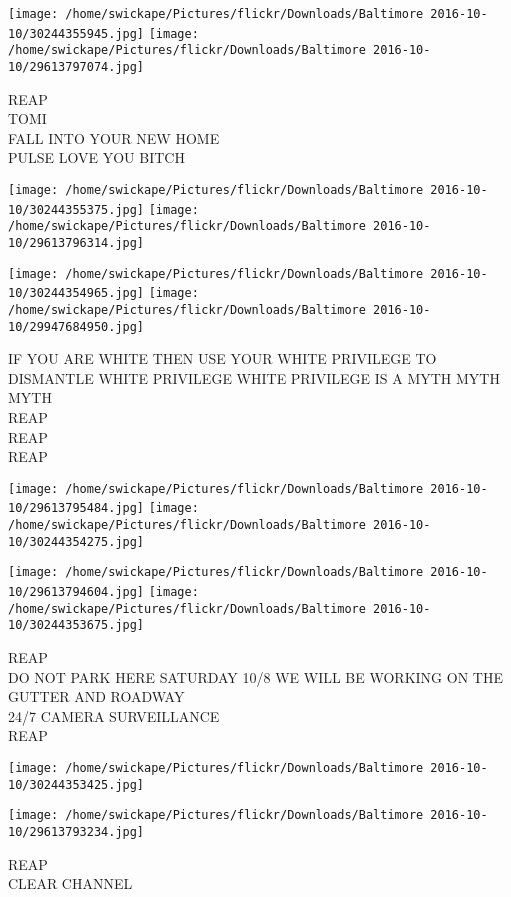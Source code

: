 \documentclass[10pt,letterpaper]{article}
\begin{document}
\texttt{[image: /home/swickape/Pictures/flickr/Downloads/Baltimore 2016-10-10/30244355945.jpg]}
\texttt{[image: /home/swickape/Pictures/flickr/Downloads/Baltimore 2016-10-10/29613797074.jpg]}

REAP\\
TOMI\\
FALL INTO YOUR NEW HOME\\
PULSE LOVE YOU BITCH
\pagebreak

\texttt{[image: /home/swickape/Pictures/flickr/Downloads/Baltimore 2016-10-10/30244355375.jpg]}
\texttt{[image: /home/swickape/Pictures/flickr/Downloads/Baltimore 2016-10-10/29613796314.jpg]}

\texttt{[image: /home/swickape/Pictures/flickr/Downloads/Baltimore 2016-10-10/30244354965.jpg]}
\texttt{[image: /home/swickape/Pictures/flickr/Downloads/Baltimore 2016-10-10/29947684950.jpg]}

IF YOU ARE WHITE THEN USE YOUR WHITE PRIVILEGE TO DISMANTLE WHITE PRIVILEGE WHITE PRIVILEGE IS A MYTH MYTH MYTH\\
REAP\\
REAP\\
REAP
\pagebreak

\texttt{[image: /home/swickape/Pictures/flickr/Downloads/Baltimore 2016-10-10/29613795484.jpg]}
\texttt{[image: /home/swickape/Pictures/flickr/Downloads/Baltimore 2016-10-10/30244354275.jpg]}

\texttt{[image: /home/swickape/Pictures/flickr/Downloads/Baltimore 2016-10-10/29613794604.jpg]}
\texttt{[image: /home/swickape/Pictures/flickr/Downloads/Baltimore 2016-10-10/30244353675.jpg]}

REAP\\
DO NOT PARK HERE SATURDAY 10/8 WE WILL BE WORKING ON THE GUTTER AND ROADWAY\\
24/7 CAMERA SURVEILLANCE\\
REAP
\pagebreak

\texttt{[image: /home/swickape/Pictures/flickr/Downloads/Baltimore 2016-10-10/30244353425.jpg]}

\vspace{0.25in}
\texttt{[image: /home/swickape/Pictures/flickr/Downloads/Baltimore 2016-10-10/29613793234.jpg]}

REAP\\
CLEAR CHANNEL
\pagebreak
\end{document}
